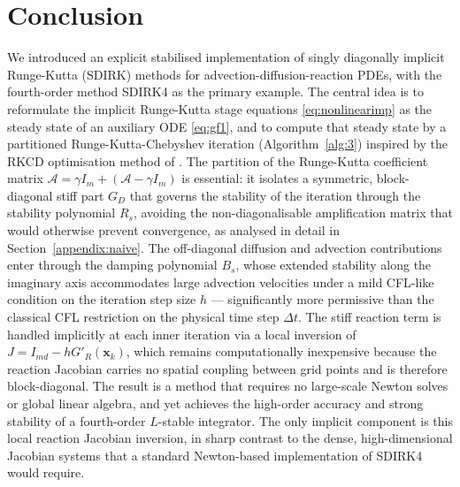 \documentclass[10pt,a4paper]{article}
\def \calA{\mathcal{A}}
\begin{document}
\section{Conclusion}


We introduced an explicit stabilised implementation of singly diagonally implicit
Runge-Kutta (SDIRK) methods for advection-diffusion-reaction PDEs, with the fourth-order
method SDIRK4 as the primary example. The central idea is to reformulate the implicit
Runge-Kutta stage equations \eqref{eq:nonlinearimp} as the steady state of an auxiliary
ODE \eqref{eq:gf1}, and to compute that steady state by a partitioned
Runge-Kutta-Chebyshev iteration (Algorithm~\ref{alg:3}) inspired by the RKCD
optimisation method of \cite{EVVZ21}. The partition of the Runge-Kutta coefficient matrix
$\calA = \gamma I_m + (\calA - \gamma I_m)$ is essential: it isolates a symmetric,
block-diagonal stiff part $G_D$ that governs the stability of the iteration through the
stability polynomial $R_s$, avoiding the non-diagonalisable amplification matrix that
would otherwise prevent convergence, as analysed in detail in Section~\ref{appendix:naive}.
The off-diagonal diffusion and advection contributions enter through the damping polynomial
$B_s$, whose extended stability along the imaginary axis accommodates large advection
velocities under a mild CFL-like condition on the iteration step size $h$ — significantly
more permissive than the classical CFL restriction on the physical time step $\Delta t$.
The stiff reaction term is handled implicitly at each inner iteration via a local inversion
of $J = I_{md} - hG'_R(\boldsymbol{x}_k)$, which remains computationally inexpensive
because the reaction Jacobian carries no spatial coupling between grid points and is
therefore block-diagonal. The result is a method that requires no large-scale Newton solves
or global linear algebra, and yet achieves the high-order accuracy and strong stability of
a fourth-order $L$-stable integrator. The only implicit component is this local reaction
Jacobian inversion, in sharp contrast to the dense, high-dimensional Jacobian systems that
a standard Newton-based implementation of SDIRK4 would require.
\end{document}
